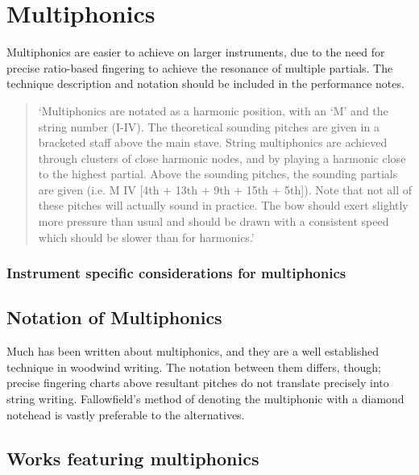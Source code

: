 \section{Multiphonics} \label{sec:multiphonics}
Multiphonics are easier to achieve on larger instruments, due to the need for precise ratio-based fingering to achieve the resonance of multiple partials.
The technique description and notation should be included in the performance notes.

\begin{quotation}
  `Multiphonics are notated as a harmonic position, with an `M' and the string number (I-IV). 
  The theoretical sounding pitches are given in a bracketed staff above the main stave.
  String multiphonics are achieved through clusters of close harmonic nodes, and by playing a harmonic close to the highest partial.
  Above the sounding pitches, the sounding partials are given (i.e. M IV [4th + 13th + 9th + 15th + 5th]).
  Note that not all of these pitches will actually sound in practice.
  The bow should exert slightly more pressure than usual and should be drawn with a consistent speed which should be slower than for harmonics.'
\end{quotation}

\subsubsection{Instrument specific considerations for multiphonics}


\subsection{Notation of Multiphonics} \label{sec:notation-multiphonics}
Much has been written about multiphonics, and they are a well established technique in woodwind writing.
The notation between them differs, though; precise fingering charts above resultant pitches do not translate precisely into string writing.
Fallowfield's method of denoting the multiphonic with a diamond notehead is vastly preferable to the alternatives.


\subsection{Works featuring multiphonics} \label{sec:multiphonicsLiterature}

